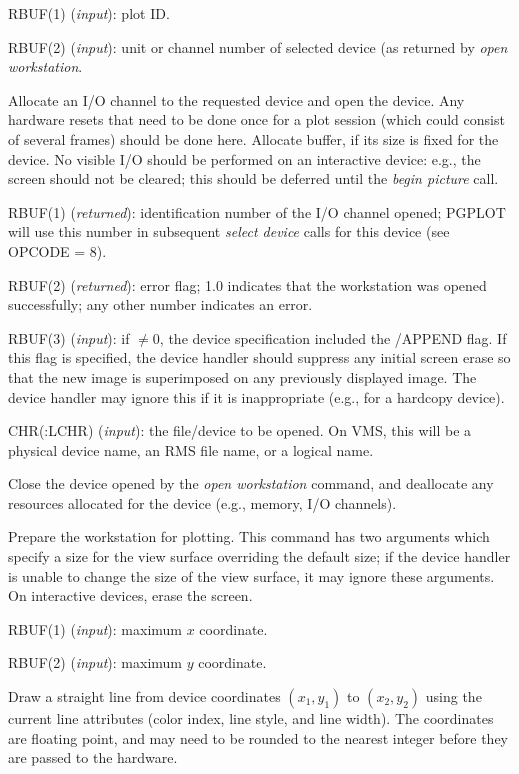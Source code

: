 RBUF(1) ({\it input\/}): plot ID.

RBUF(2) ({\it input\/}): unit or channel number of selected device (as returned 
by {\it open workstation\/}.


Allocate an I/O channel to the requested device and open the device.
Any hardware resets that need to be done once for a plot session
(which could consist of several frames) should be done
here. Allocate buffer, if its size is fixed for the device. No visible 
I/O should be performed on an interactive device: e.g., the screen 
should not be cleared; this should be deferred until the {\it begin 
picture\/} call.

RBUF(1) ({\it returned\/}): identification number of the I/O channel opened; 
PGPLOT will use this number in subsequent {\it select device\/} calls
for this device (see OPCODE = 8).

RBUF(2) ({\it returned\/}): error flag; 1.0 indicates that the workstation was 
opened successfully; any other number indicates an error.

RBUF(3) ({\it input\/}): if $\not=0$, the device specification included
the /APPEND flag. If this flag is specified, the device handler should 
suppress any initial screen erase so that the new image is superimposed
on any previously displayed image.  The device handler may ignore this
if it is inappropriate (e.g., for a hardcopy device).

CHR(:LCHR) ({\it input\/}): the file/device to be opened. On VMS, this will be
a physical device name, an RMS file name, or a logical name.


Close the device opened by the {\it open workstation\/} command, and 
deallocate any resources allocated for the device (e.g., memory, I/O 
channels).

Prepare the workstation for plotting.  This command has two arguments 
which specify a size for the view surface overriding the default size; 
if the device handler is unable to change the size of the view surface, 
it may ignore these arguments. On interactive devices, erase the screen.

RBUF(1) ({\it input\/}): maximum $x$ coordinate.

RBUF(2) ({\it input\/}): maximum $y$ coordinate.


Draw a straight line from device coordinates $(x_1,y_1)$ to $(x_2,y_2)$
using the current line attributes (color index, line style, and line
width). The coordinates are floating point, and may need to be rounded
to the nearest integer before they are passed to the hardware. 

